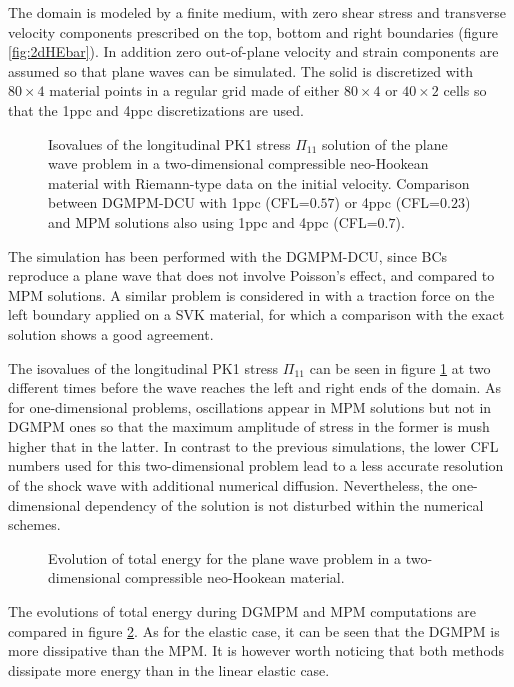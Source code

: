 The domain is modeled by a finite medium, with zero shear stress and transverse velocity components prescribed on the top, bottom and right boundaries (figure \ref{fig:2dHEbar}).
In addition zero out-of-plane velocity and strain components are assumed so that plane waves can be simulated.
The solid is discretized with $80\times 4$ material points in a regular grid made of either $80\times 4$ or $40\times 2$ cells so that the 1ppc and 4ppc discretizations are used.
\begin{figure}[h!]
  \centering
  
  \caption{Isovalues of the longitudinal PK1 stress $\Pi_{11}$ solution of the plane wave problem in a two-dimensional compressible neo-Hookean material with Riemann-type data on the initial velocity. Comparison between DGMPM-DCU with 1ppc (CFL=$0.57$) or 4ppc (CFL=$0.23$) and MPM solutions also using 1ppc and 4ppc (CFL=$0.7$).}
  \label{fig:2dplane_Wave}
\end{figure}
The simulation has been performed with the DGMPM-DCU, since BCs reproduce a plane wave that does not involve Poisson's effect, and compared to MPM solutions. A similar problem is considered in \cite{DGMPM} with a traction force on the left boundary applied on a SVK material, for which a comparison with the exact solution shows a good agreement.

The isovalues of the longitudinal PK1 stress $\Pi_{11}$ can be seen in figure \ref{fig:2dplane_Wave} at two different times before the wave reaches the left and right ends of the domain.
As for one-dimensional problems, oscillations appear in MPM solutions but not in DGMPM ones so that the maximum amplitude of stress in the former is mush higher that in the latter.
In contrast to the previous simulations, the lower CFL numbers used for this two-dimensional problem lead to a less accurate resolution of the shock wave with additional numerical diffusion.
Nevertheless, the one-dimensional dependency of the solution is not disturbed within the numerical schemes.
\begin{figure}[h!]
  \centering
  
  \caption{Evolution of total energy for the plane wave problem in a two-dimensional compressible neo-Hookean material.}
  \label{fig:pw_energy}
\end{figure}

The evolutions of total energy during DGMPM and MPM computations are compared in figure \ref{fig:pw_energy}.
As for the elastic case, it can be seen that the DGMPM is more dissipative than the MPM. It is however worth noticing that both methods dissipate more energy than in the linear elastic case. 

